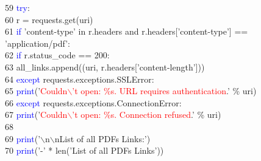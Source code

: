 59	 \hspace*{5mm}        \hspace*{10mm}\textcolor{blue}{try}:\\
60	 \hspace*{5mm}            \hspace*{15mm}r = requests.get(uri)\\
61	 \hspace*{5mm}            \hspace*{15mm}\textcolor{blue}{if} 'content-type' in r.headers and r.headers['content-type'] == 'application/pdf':\\
62	 \hspace*{5mm}                \hspace*{20mm}\textcolor{blue}{if} r.status\_code == 200:\\
63	 \hspace*{5mm}                    \hspace*{25mm}all\_links.append((uri, r.headers['content-length']))\\
64	 \hspace*{5mm}        \hspace*{10mm}\textcolor{blue}{except} requests.exceptions.SSLError:\\
65	 \hspace*{5mm}            \hspace*{15mm}\textcolor{blue}{print}('\textcolor{red}{Couldn$\backslash$'t open: \%s. URL requires authentication}.' \% uri)\\
66	 \hspace*{5mm}        \hspace*{10mm}\textcolor{blue}{except} requests.exceptions.ConnectionError:\\
67	 \hspace*{5mm}            \hspace*{15mm}\textcolor{blue}{print}('\textcolor{red}{Couldn$\backslash$'t open: \%s. Connection refused}.' \% uri)\\
68	 \hspace*{5mm}\\
69	 \hspace*{5mm}    \hspace*{5mm}\textcolor{blue}{print}('$\backslash$n$\backslash$nList of all PDFs Links:')\\
70	 \hspace*{5mm}    \hspace*{5mm}\textcolor{blue}{print}('-' * len('List of all PDFs Links'))\\
